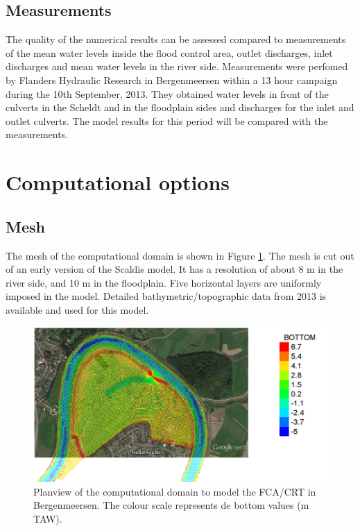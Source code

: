 \subsection{Measurements}
The quality of the numerical results can be assessed compared to measurements of the mean water levels inside the flood control area, 
outlet discharges, inlet discharges and mean water levels in the river side. 
Measurements were perfomed by Flanders Hydraulic Research in Bergenmeersen 
within a 13 hour campaign during the 10th September, 2013. 
They obtained water levels in front of the culverts in the Scheldt 
and in the floodplain sides and discharges for the inlet and outlet culverts. 
The model results for this period will be compared with the measurements. 
%
%
\section{Computational options}
%
\subsection{Mesh}
The mesh of the computational domain is shown in Figure \ref{fig:bergenmeersen_figure4}.
The mesh is cut out of an early version of the Scaldis model. 
It has a resolution of about 8 m in the river side, and 10 m in the floodplain. 
Five horizontal layers are uniformly imposed in the model. 
Detailed bathymetric/topographic data from 2013 is available and used for this model.
\begin{figure}[H]
\begin{center}
  \includegraphics[scale=0.5]{figure4.png}
\end{center}
\caption{Planview of the computational domain to model the FCA/CRT in Bergenmeersen.
The colour scale represents de bottom values (m TAW).}
\label{fig:bergenmeersen_figure4}
\end{figure}
%
